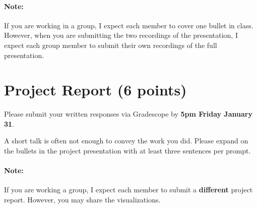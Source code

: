 \documentclass{article}
\begin{document}
\paragraph{Note:} If you are working in a group, I expect each member to
cover one bullet in class.
However, when you are submitting the two recordings of the presentation,
I expect each group member to submit their own recordings of the full
presentation.

\section{Project Report (6 points)}
Please submit your written responses via Gradescope
by \textbf{5pm Friday January 31}.

A short talk is often not enough to convey the work you did.
Please expand on the bullets in the project presentation with
at least three sentences per prompt.

\paragraph{Note:} If you are working a group, I expect each member to submit a \textbf{different} project report. However, you may share the visualizations.
\end{document}
